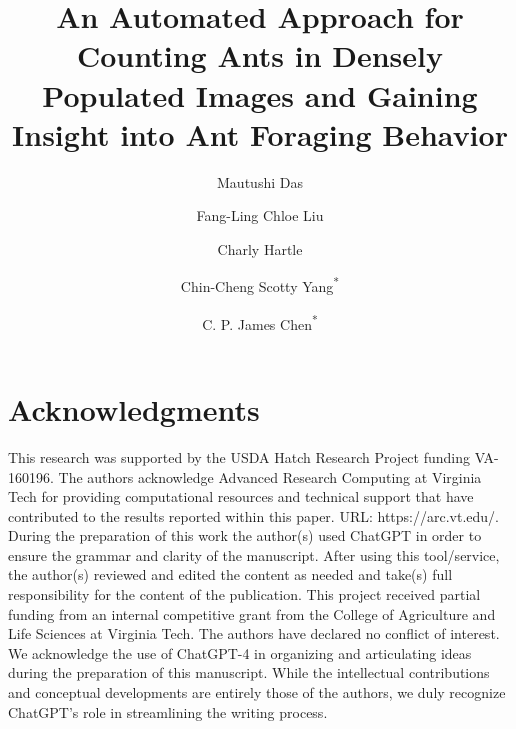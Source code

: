 \documentclass{article}
\title{An Automated Approach for Counting Ants in Densely Populated Images and Gaining Insight into Ant Foraging Behavior }
\author[1]{Mautushi Das}
\author[2]{Fang-Ling Chloe Liu}
\author[2]{Charly Hartle}
\author[2]{Chin-Cheng Scotty Yang\textsuperscript{*}}
\author[1]{C. P. James Chen\textsuperscript{*}}
\affil[1]{School of Animal Sciences, Virginia Tech, Blacksburg, VA 24061, USA}
\affil[2]{Department of Entomology, Virginia Tech, Blacksburg, VA 24061, USA}
\begin{document}
\maketitle








\section*{Acknowledgments}

This research was supported by the USDA Hatch Research Project funding VA-160196. The authors acknowledge Advanced Research Computing at Virginia Tech for providing computational resources and technical support that have contributed to the results reported within this paper. URL: https://arc.vt.edu/. During the preparation of this work the author(s) used ChatGPT in order to ensure the grammar and clarity of the manuscript. After using this tool/service, the author(s) reviewed and edited the content as needed and take(s) full responsibility for the content of the publication.
This project received partial funding from an internal competitive grant from the College of Agriculture and Life Sciences at Virginia Tech. The authors have declared no conflict of interest. We acknowledge the use of ChatGPT-4 in organizing and articulating ideas during the preparation of this manuscript. While the intellectual contributions and conceptual developments are entirely those of the authors, we duly recognize ChatGPT’s role in streamlining the writing process.

\newpage





\newpage
\end{document}

